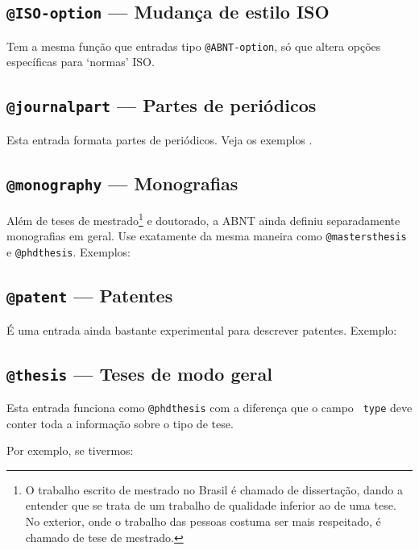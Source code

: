 \documentclass[a4paper]{ltxdoc}
\begin{document}
\subsection{{\tt @ISO-option} --- Mudança de estilo ISO}

Tem a mesma função que entradas tipo {\tt @ABNT-option}, só que altera
opções específicas para `normas' ISO.

\subsection{{\tt @journalpart} --- Partes de periódicos }

Esta entrada formata partes de periódicos. Veja os exemplos
.

\subsection{{\tt @monography} --- Monografias}

Além de teses de mestrado\footnote{O trabalho escrito de mestrado no Brasil
é chamado de dissertação, dando a entender que se trata de um trabalho
de qualidade inferior ao de uma tese. No exterior, onde o trabalho das pessoas
costuma ser mais respeitado, é chamado de tese de mestrado.} e doutorado, a
ABNT ainda definiu separadamente monografias em geral. Use exatamente da mesma
maneira como {\tt @mastersthesis} e {\tt @phdthesis}. Exemplos:

\subsection{{\tt @patent} --- Patentes}

É uma entrada ainda bastante experimental para descrever patentes. Exemplo:

\subsection{{\tt @thesis} --- Teses de modo geral}

Esta entrada funciona como {\tt @phdthesis} com a diferença que o campo {\tt
type} deve conter toda a informação sobre o tipo de tese. 

Por exemplo, se tivermos:
\end{document}
